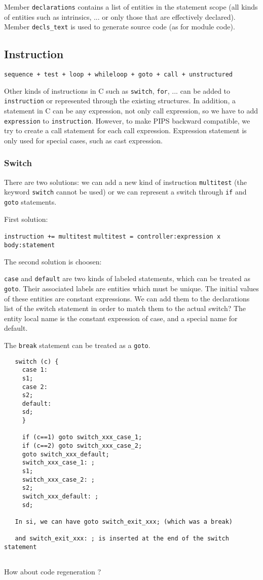 \documentclass[a4paper]{article}
\begin{document}
Member \verb/declarations/ contains a list of entities in the statement
scope (all kinds of entities such as intrinsics, ... or only those that
are effectively declared).  Member \verb/decls_text/ is used to generate source code (as for module code).

\subsection{Instruction}

\verb/sequence + test + loop + whileloop + goto + call + unstructured/

Other kinds of instructions in C such as \verb/switch/, \verb/for/, ... can be
added to \verb/instruction/ or represented through the existing structures. 
In addition, a statement in C can be any expression, not only call
expression, so we have to add \verb/expression/ to \verb/instruction/. 
However, to make PIPS backward compatible, we try to create a call
statement for each call expression. Expression statement is only used for
special cases, such as cast expression.
 
\subsubsection{Switch}
There are two solutions: we can add a new kind of instruction
\verb/multitest/ (the keyword \verb/switch/ cannot be used) or we can
represent a switch through \verb/if/ and \verb/goto/ statements.  

First solution: 

\verb/instruction += multitest/
\verb/multitest = controller:expression x body:statement/

The second solution is choosen: 
 
\verb/case/ and \verb/default/ are two kinds of labeled statements, which
can be treated as \verb/goto/. Their
associated labels are entities which must be unique.  The initial values of these
entities are constant expressions. We can add them to the
declarations list of the switch statement in order to match them to the actual
switch? The entity local name is the constant expression of case, and a
special name for default.  

The \verb/break/ statement can be treated as a \verb/goto/.

\begin{verbatim}
   switch (c) {
     case 1:
     s1;
     case 2: 
     s2;  
     default: 
     sd;
     }

     if (c==1) goto switch_xxx_case_1;
     if (c==2) goto switch_xxx_case_2;
     goto switch_xxx_default;
     switch_xxx_case_1: ;
     s1;
     switch_xxx_case_2: ;
     s2;
     switch_xxx_default: ;
     sd;      

   In si, we can have goto switch_exit_xxx; (which was a break) 

   and switch_exit_xxx: ; is inserted at the end of the switch statement
             
\end{verbatim}
How about code regeneration ? 
\end{document}
